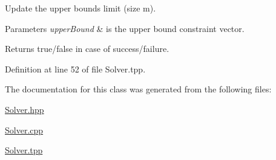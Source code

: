 Update the upper bounds limit (size m). 


\begin{DoxyParams}{Parameters}
{\em upper\+Bound} & is the upper bound constraint vector. \\
\hline
\end{DoxyParams}
\begin{DoxyReturn}{Returns}
true/false in case of success/failure. 
\end{DoxyReturn}


Definition at line 52 of file Solver.\+tpp.



The documentation for this class was generated from the following files\+:\begin{DoxyCompactItemize}
\item 
\hyperlink{Solver_8hpp}{Solver.\+hpp}\item 
\hyperlink{Solver_8cpp}{Solver.\+cpp}\item 
\hyperlink{Solver_8tpp}{Solver.\+tpp}\end{DoxyCompactItemize}

